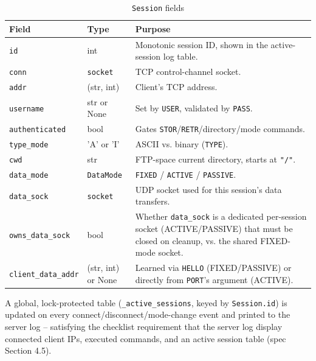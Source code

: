\documentclass[11pt]{article}
\begin{document}
\begin{table}[htbp]
\centering
\caption{\texttt{Session} fields}
\label{tab:session-struct}
\begin{tabular}{@{}llp{8.7cm}@{}}
\toprule
\textbf{Field} & \textbf{Type} & \textbf{Purpose} \\
\midrule
\texttt{id}                & int             & Monotonic session ID, shown in the active-session log table. \\
\texttt{conn}               & \texttt{socket} & TCP control-channel socket. \\
\texttt{addr}                & (str, int)      & Client's TCP address. \\
\texttt{username}            & str or None     & Set by \texttt{USER}, validated by \texttt{PASS}. \\
\texttt{authenticated}       & bool            & Gates \texttt{STOR}/\texttt{RETR}/directory/mode commands. \\
\texttt{type\_mode}          & 'A' or 'I'      & ASCII vs. binary (\texttt{TYPE}). \\
\texttt{cwd}                 & str             & FTP-space current directory, starts at \texttt{"/"}. \\
\texttt{data\_mode}          & \texttt{DataMode} & \texttt{FIXED} / \texttt{ACTIVE} / \texttt{PASSIVE}. \\
\texttt{data\_sock}          & \texttt{socket} & UDP socket used for this session's data transfers. \\
\texttt{owns\_data\_sock}    & bool            & Whether \texttt{data\_sock} is a dedicated per-session
                                                   socket (ACTIVE/PASSIVE) that must be closed on cleanup,
                                                   vs. the shared FIXED-mode socket. \\
\texttt{client\_data\_addr}  & (str, int) or None & Learned via \texttt{HELLO} (FIXED/PASSIVE) or directly
                                                       from \texttt{PORT}'s argument (ACTIVE). \\
\bottomrule
\end{tabular}
\end{table}

A global, lock-protected table (\texttt{\_active\_sessions}, keyed by \texttt{Session.id})
is updated on every connect/disconnect/mode-change event and printed to the server
log -- satisfying the checklist requirement that the server log display connected
client IPs, executed commands, and an active session table (spec Section 4.5).
\end{document}
